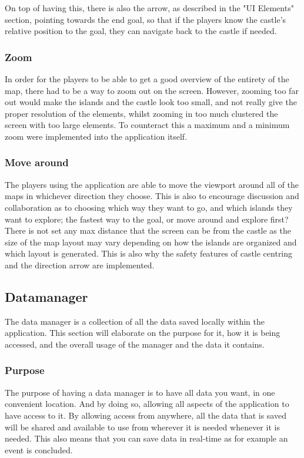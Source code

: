On top of having this, there is also the arrow, as described in the "UI Elements" section, pointing towards the end goal, so that if the players know the castle's relative position to the goal, they can navigate back to the castle if needed. 

\subsubsection{Zoom}
In order for the players to be able to get a good overview of the entirety of the map, there had to be a way to zoom out on the screen. 
However, zooming too far out would make the islands and the castle look too small, and not really give the proper resolution of the elements, whilst zooming in too much clustered the screen with too large elements. To counteract this a maximum and a minimum zoom were implemented into the application itself.	

	
\subsubsection{Move around}

The players using the application are able to move the viewport around all of the maps in whichever direction they choose. This is also to encourage discussion and collaboration as to choosing which way they want to go, and which islands they want to explore; the fastest way to the goal, or move around and explore first?
There is not set any max distance that the screen can be from the castle as the size of the map layout may vary depending on how the islands are organized and which layout is generated. This is also why the safety features of castle centring and the direction arrow are implemented.

\subsection{Datamanager}
\label{sec:datman}
The data manager is a collection of all the data saved locally within the application. This section will elaborate on the purpose for it, how it is being accessed, and the overall usage of the manager and the data it contains.

\subsubsection{Purpose}
	
The purpose of having a data manager is to have all data you want, in one convenient location. And by doing so, allowing all aspects of the application to have access to it. By allowing access from anywhere, all the data that is saved will be shared and available to use from wherever it is needed whenever it is needed. This also means that you can save data in real-time as for example an event is concluded.

